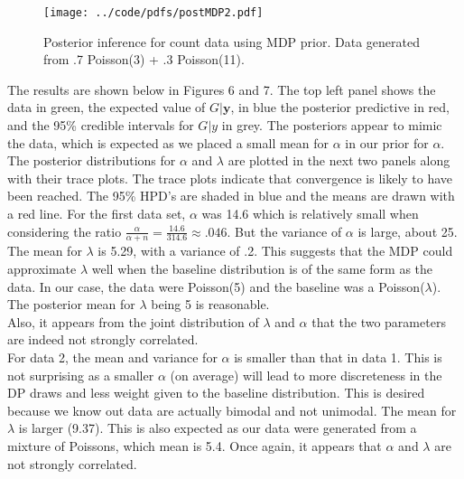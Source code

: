 \documentclass{article}
\def\beginmyfig{\begin{figure}[htbp]\begin{center}}
\def\endmyfig{\end{center}\end{figure}}
\begin{document}
\beginmyfig
  \texttt{[image: ../code/pdfs/postMDP2.pdf]}
  \caption{Posterior inference for count data using MDP prior. Data generated from
  .7 Poisson(3) + .3 Poisson(11).}
\endmyfig

\noindent
The results are shown below in Figures 6 and 7. The top left panel shows the
data in green, the expected value of $G|\mathbf y$, in blue the posterior
predictive in red, and the 95\% credible intervals for $G|y$ in grey. The
posteriors appear to mimic the data, which is expected as we placed a small
mean for $\alpha$ in our prior for $\alpha$. The posterior distributions for
$\alpha$ and $\lambda$ are plotted in the next two panels along with their
trace plots.  The trace plots indicate that convergence is likely to have been
reached. The 95\% HPD's are shaded in blue and the means are drawn with a red
line. For the first data set, $\alpha$ was 14.6 which is relatively small when
considering the ratio $\frac{\alpha}{\alpha+n}= \frac{14.6}{314.6} \approx
.046$. But the variance of $\alpha$ is large, about 25. The mean for $\lambda$
is 5.29, with a variance of .2. This suggests that the MDP could approximate
$\lambda$ well when the baseline distribution is of the same form as the data.
In our case, the data were Poisson(5) and the baseline was a
Poisson($\lambda$). The posterior mean for $\lambda$ being 5 is reasonable.\\
Also, it appears from the joint distribution of $\lambda$ and $\alpha$ that the
two parameters are indeed not strongly correlated.\\

\noindent
For data 2, the mean and variance for $\alpha$ is smaller than that in data 1.
This is not surprising as a smaller $\alpha$ (on average) will lead to more
discreteness in the DP draws and less weight given to the baseline
distribution. This is desired because we know out data are actually bimodal and
not unimodal. The mean for $\lambda$ is larger (9.37). This is also expected
as our data were generated from a mixture of Poissons, which mean is 5.4. Once
again, it appears that $\alpha$ and $\lambda$ are not strongly correlated.
\end{document}
